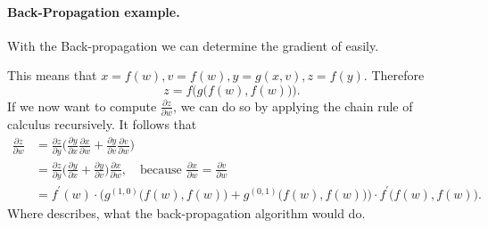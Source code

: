 \paragraph{Back-Propagation example.}
With the Back-propagation we can determine the gradient of  easily.

This means that \(x = f(w), v = f(w), y = g(x,v), z = f(y)\).
Therefore
\begin{equation}
    z = f\Big( g \big( f(w),f(w) \big) \Big).
\end{equation}
If we now want to compute \(\frac{\partial z}{\partial w}\), we can do so by applying the chain rule of calculus recursively.
It follows that
\begin{align}
    \frac{\partial z}{\partial w} &= \frac{\partial z}{\partial y} \Bigg( \frac{\partial y}{\partial x} \frac{\partial x}{\partial w} + \frac{\partial y}{\partial v} \frac{\partial v}{\partial w} \Bigg) \label{eq:back-prop-example} \\
    &= \frac{\partial z}{\partial y} \Bigg( \frac{\partial y}{\partial x} + \frac{\partial y}{\partial v} \Bigg) \frac{\partial x}{\partial w}, \quad \text{because } \frac{\partial x}{\partial w} = \frac{\partial v}{\partial w} \\
    &= f^\prime (w) \cdot \Big( g^{(1,0)} \big( f(w), f(w) \big) + g^{(0,1)} \big( f(w), f(w) \big) \Big) \cdot f^\prime \big( f(w), f(w)\big).
\end{align}
Where  describes, what the back-propagation algorithm would do.